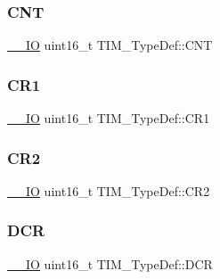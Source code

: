 \subsubsection{\texorpdfstring{CNT}{CNT}}
{\footnotesize\ttfamily \mbox{\hyperlink{group___c_m_s_i_s___c_m3__core__definitions_gaec43007d9998a0a0e01faede4133d6be}{\+\_\+\+\_\+\+IO}} uint16\+\_\+t T\+I\+M\+\_\+\+Type\+Def\+::\+C\+NT}

\mbox{\label{struct_t_i_m___type_def_a410988826004fdd21d55071215144ba9}} 
\subsubsection{\texorpdfstring{CR1}{CR1}}
{\footnotesize\ttfamily \mbox{\hyperlink{group___c_m_s_i_s___c_m3__core__definitions_gaec43007d9998a0a0e01faede4133d6be}{\+\_\+\+\_\+\+IO}} uint16\+\_\+t T\+I\+M\+\_\+\+Type\+Def\+::\+C\+R1}

\mbox{\label{struct_t_i_m___type_def_a954eb69fd4e2e6b43ba6c80986f691d8}} 
\subsubsection{\texorpdfstring{CR2}{CR2}}
{\footnotesize\ttfamily \mbox{\hyperlink{group___c_m_s_i_s___c_m3__core__definitions_gaec43007d9998a0a0e01faede4133d6be}{\+\_\+\+\_\+\+IO}} uint16\+\_\+t T\+I\+M\+\_\+\+Type\+Def\+::\+C\+R2}

\mbox{\label{struct_t_i_m___type_def_ad3186a43824621f049e7eff37c88ad4e}} 
\subsubsection{\texorpdfstring{DCR}{DCR}}
{\footnotesize\ttfamily \mbox{\hyperlink{group___c_m_s_i_s___c_m3__core__definitions_gaec43007d9998a0a0e01faede4133d6be}{\+\_\+\+\_\+\+IO}} uint16\+\_\+t T\+I\+M\+\_\+\+Type\+Def\+::\+D\+CR}

\mbox{\label{struct_t_i_m___type_def_a25b145e57a694bb384eee08fcd107c3a}} 
